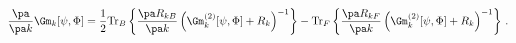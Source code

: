\begin{equation}
  \label{frame}
  \frac{\pa}{\pa k}\Gm_k[\psi,\Phi] = \frac{1}{2}{\rm Tr}_B 
  \left\{ \frac{\pa R_{kB}}
    {\pa k} \left(\Gm^{(2)}_k[\psi,\Phi]+R_k\right)^{-1}  \right\} 
    -{\rm Tr}_F \left\{ \frac{\pa R_{kF}}
    {\pa k} \left(\Gm^{(2)}_k[\psi,\Phi]+R_k\right)^{-1} 
  \right\} \, .
\end{equation}

